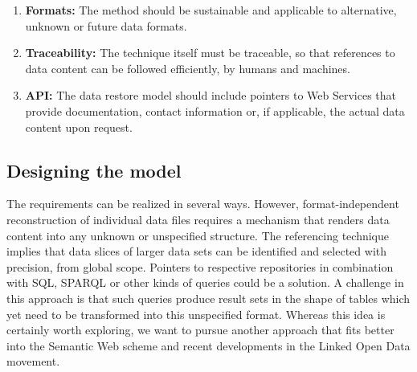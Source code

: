 \documentclass{acm_proc_article-sp}
\begin{document}
\begin{enumerate}
  \item \textbf{Formats:} The method should be sustainable and applicable to alternative, unknown or future data formats.

  \item \textbf{Traceability:} The technique itself must be traceable, so that references to data content can be followed efficiently, by humans and machines.
 

  \item \textbf{API:} The data restore model should include pointers to Web Services that provide documentation, contact information or, if applicable, the actual data content upon request.

\end{enumerate}





\subsection{Designing the model}


The requirements can be realized in several ways.
However, format-independent reconstruction of individual data files requires a mechanism that renders data content into any unknown or unspecified structure.
The referencing technique implies that data slices of larger data sets can be identified and selected with precision, from global scope.
Pointers to respective repositories in combination with SQL, SPARQL or other kinds of queries could be a solution.
A challenge in this approach is that such queries produce result sets in the shape of tables which yet need to be transformed into this unspecified format.
Whereas this idea is certainly worth exploring, we want to pursue another approach that fits better into the Semantic Web scheme and recent developments in the Linked Open Data movement.
\end{document}
